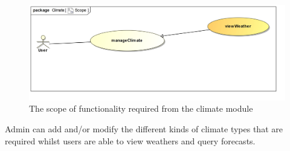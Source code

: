 
\begin{figure}[H]
	\centering
	\includegraphics[width=1.0\textwidth]{../images/funcReq/ClimateScope.jpg}
	\caption{The scope of functionality required from the climate module \label{overflow}}
\end{figure}

Admin can add and/or modify the different kinds of climate types that are required whilst users are able to view weathers and query forecasts.